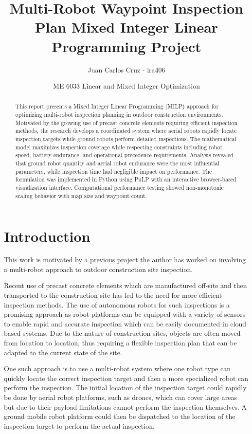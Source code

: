 \documentclass{article}
\title{Multi-Robot Waypoint Inspection Plan Mixed Integer Linear Programming Project}
\author{Juan Carlos Cruz - ira406}
\date{ME 6033 Linear and Mixed Integer Optimization}
\begin{document}
	\maketitle
	\noindent%

	\begin{abstract}
	This report presents a Mixed Integer Linear Programming (MILP) approach for optimizing multi-robot inspection planning in outdoor construction environments. 
	Motivated by the growing use of precast concrete elements requiring efficient inspection methods, the research develops a coordinated system where aerial robots rapidly locate inspection targets while ground robots perform detailed inspections. 
	The mathematical model maximizes inspection coverage while respecting constraints including robot speed, battery endurance, and operational precedence requirements. 
	Analysis revealed that ground robot quantity and aerial robot endurance were the most influential parameters, while inspection time had negligible impact on performance. 
	The formulation was implemented in Python using PuLP with an interactive browser-based visualization interface. 
	Computational performance testing showed non-monotonic scaling behavior with map size and waypoint count. 
	\end{abstract}

	\section{Introduction}\label{intro}

		This work is motivated by a previous project the author has worked on involving a multi-robot approach to outdoor construction site inspection. 

		Recent use of precast concrete elements which are manufactured off-site and then transported to the construction site has led to the need for more efficient inspection methods. 
		The use of autonomous robots for such inspections is a promising approach as robot platforms can be equipped with a variety of sensors to enable rapid and accurate inspection which can be easily documented in cloud based systems.
		Due to the nature of construction sites, objects are often moved from location to location, thus requiring a flexible inspection plan that can be adapted to the current state of the site.

		One such approach is to use a multi-robot system where one robot type can quickly locate the correct inspection target and then a more specialized robot can perform the inspection.
		The initial location of the inspection target could rapidly be done by aerial robot platforms, such as drones, which can cover large areas but due to their payload limitations cannot perform the inspection themselves.
		A ground mobile robot platform could then be dispatched to the location of the inspection target to perform the actual inspection.
\end{document}
